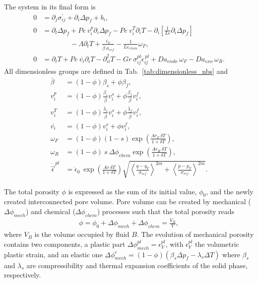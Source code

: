 \documentclass[]{scrreprt}
\newcommand{\pd}{\ensuremath{\partial}}
\newcommand{\pdiff}[2]{\ensuremath{\pd_{#2} #1}}
\begin{document}
The system in its final form is
\begin{subequations}
\label{eq:final_system_of_equations_dimensionless}
\begin{align}
  0 &= \pdiff{\sigma^{\prime}_{ij}}{j} + \pdiff{\Delta p_f}{i} + b_i, \\   
  0 &= \pdiff{\Delta p_f}{t} + Pe\: v^p_i \pdiff{\Delta p_f}{i} -
  Pe\:v^T_i \pdiff{T}{i} - \pdiff{\left[\frac{1}{Le} \pdiff{\Delta
  p_f}{i} \right]}{i} \\ \nonumber
  ~ & \qquad\qquad - \Lambda \pdiff{T}{t} +
  \frac{\dot{\epsilon_V}}{\bar{\beta}\:\sigma_{ref}} -\frac{1}{Le_{chem}}
  \omega_F, \\
  0 &= \pdiff{T}{t} + Pe\:\bar{v_i}\pdiff{T}{i} - \pd_{ii}^2 T - Gr
  \: \sigma_{ij}^{pl}\dot{\epsilon}_{ij}^{\,pl}  + Da_{endo}\: \omega_F -
  Da_{exo}\: \omega_R.
\end{align}
\end{subequations}
All dimensionless groups are defined in Tab.~\ref{tab:dimensionless_nbs} and
\begin{align*}
  \bar{\beta} &= (1-\phi)\beta_s + \phi\beta_f, \\
  v_i^p &= (1-\phi)\frac{\beta_s}{\bar{\beta}} v_i^s + 
    \phi\frac{\beta_f}{\bar{\beta}}v_i^f, \\
  v^T_i &= (1-\phi)\frac{\bar{\lambda}_s}{\bar{\beta}} v_i^s + 
    \phi\frac{\bar{\lambda}_f}{\bar{\beta}} v_i^f,\\
  \bar{v_i} &= (1-\phi) v_i^s + \phi v_i^f, \\
  \omega_F &= (1-\phi)(1-s)\exp\left(\frac{Ar_F \: \delta T}{1 + \delta T}
  \right), \\
  \omega_R &= (1-\phi)\:s\:\Delta \phi_{chem}\exp\left(\frac{Ar_R \: \delta
  T}{1 + \delta T} \right), \\
  \dot{\vec{\epsilon}}^{pl} &= \dot \epsilon_0 \: \exp\left( \frac{Ar \: \delta
  T}{1 + \delta T}\right) \sqrt{ \left\langle\frac{q -
  q_Y}{\sigma_{ref}}\right\rangle^{2m} + \left\langle\frac{p
  - p_Y}{\sigma_{ref}}\right\rangle^{2m}}.
\end{align*}



The total porosity $\phi$ is expressed as the sum of its initial value, $\phi_0$,
and the newly created interconnected pore volume. Pore volume can be created
by mechanical ($\Delta\phi_{mech}$) and chemical ($\Delta \phi_{chem}$)
processes such that the total porosity reads
\begin{eqnarray}
    \label{eq:porosity}
    \phi = \phi_0 + \Delta\phi_{mech} + \Delta\phi_{chem} = \frac{V_{B}}{V},
\end{eqnarray}
where $V_B$ is the volume occupied by fluid $B$.  The evolution of mechanical
porosity contains two components, a plastic part $\Delta
\phi^{pl}_{mech}=\epsilon^{pl}_V$, with $\epsilon^{pl}_V$ the volumetric plastic strain, and an
elastic one $\Delta \phi^{e}_{mech}=(1-\phi)\left( \beta_s \Delta p_f -
\lambda_s \Delta T \right)$
where $\beta_s$ and $\lambda_s$ are compressibility and
thermal expansion coefficients of the solid phase, respectively.
\end{document}
